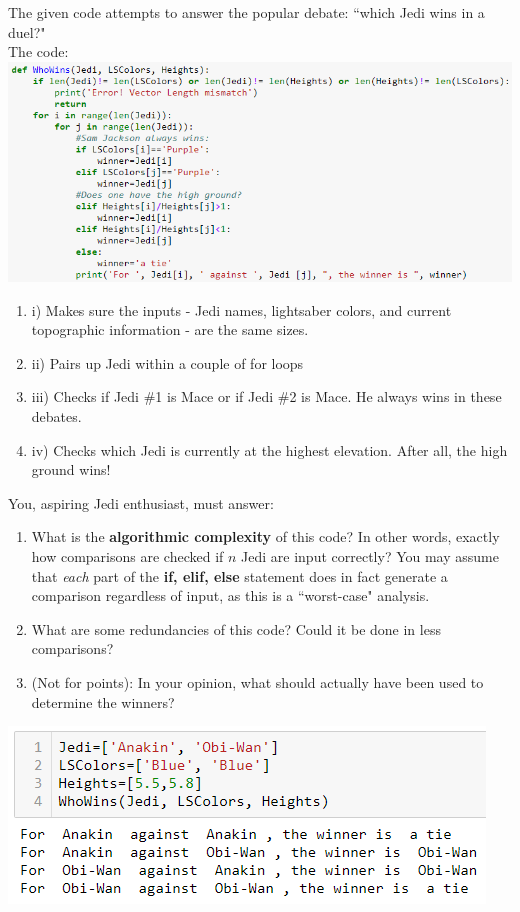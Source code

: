 \documentclass[11pt]{amsart}
\newcommand{\be}{\begin{enumerate}}
\newcommand{\ee}{\end{enumerate}}
\begin{document}
\item The given code attempts to answer the popular debate: ``which Jedi wins in a duel?"  \\
	The code:\\
	\includegraphics[width=.6\textwidth]{JediCode}\\
	\be
		\item[i)] Makes sure the inputs - Jedi names, lightsaber colors, and current topographic information - are the same sizes.
		\item[ii)] Pairs up Jedi within a couple of for loops
		\item[iii)] Checks if Jedi \#1 is Mace or if Jedi \#2 is Mace. He always wins in these debates.
		\item[iv)] Checks which Jedi is currently at the highest elevation.  After all, the high ground wins!
	\ee
	You, aspiring Jedi enthusiast, must answer:
	\be
		\item What is the \textbf{algorithmic complexity} of this code?  In other words, exactly how comparisons are checked if $n$ Jedi are input correctly?  You may assume that \textit{each} part of the \textbf{if, elif, else} statement does in fact generate a comparison regardless of input, as this is a ``worst-case" analysis.
		\item What are some redundancies of this code?  Could it be done in less comparisons?
		\item (Not for points): In your opinion, what should actually have been used to determine the winners?
	\ee
	\includegraphics[width=.6\textwidth]{JediOutput}\\
\end{document}
